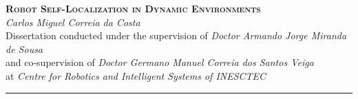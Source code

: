 \documentclass[9pt,a4paper]{extarticle}
\begin{document}
\begin{center}
  \huge{\textbf{\textsc{Robot Self-Localization in Dynamic Environments}}}\\[4mm]
  \Large{\emph{Carlos Miguel Correia da Costa}}\\[2mm]
  \normalsize{Dissertation conducted under the supervision of \emph{Doctor Armando Jorge Miranda de Sousa}\\and co-supervision of \emph{Doctor Germano Manuel Correia dos Santos Veiga}}\\
  \normalsize{at \emph{Centre for Robotics and Intelligent Systems of INESCTEC}}
\end{center}

\thispagestyle{empty}
\vspace*{-4mm}\noindent\rule{\textwidth}{0.4pt}\vspace*{4mm}



\end{document}
